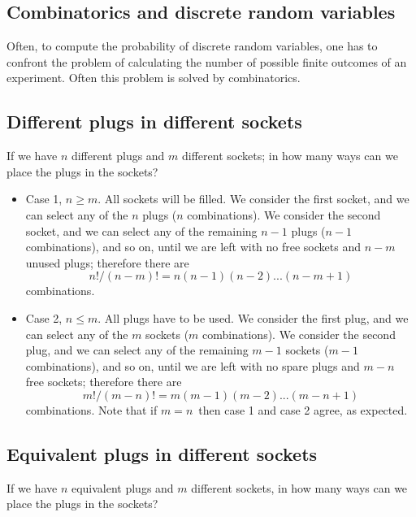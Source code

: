 \documentclass[justified, sixbynine]{tufte-book}
\theoremstyle{plain}%
\newtheorem * {corollary}{Corollary}
\theoremstyle{definition}
\theoremstyle{remark}
\newtheorem * {remark}{Remark}
\newtheorem * {note}{Note}
\begin{document}
\begin{fullwidth}
\goodbreak\section{Combinatorics and discrete random variables}

Often, to compute the probability of discrete random variables, one
has to confront the problem of calculating the number of possible finite
outcomes of an experiment. Often this problem is solved by combinatorics.

\goodbreak\subsection{Different plugs in different sockets}

If we have $n$ different plugs and $m$ different sockets; in how many ways
can we place the plugs in the sockets?

\begin{itemize}
\item  Case 1, $n\geq m$. All sockets will be filled. We consider the first
socket, and we can select any of the $n$ plugs ($n$ combinations). We
consider the second socket, and we can select any of the remaining $n-1$
plugs ($n-1$ combinations), and so on, until we are left with no free sockets
and $n-m$ unused plugs; therefore there are
\begin{equation}
n!/(n-m)!=n(n-1)(n-2)...(n-m+1)
\end{equation}
combinations.

\item  Case 2, $n\leq m$. All plugs have to be used. We consider the first
plug, and we can select any of the $m$ sockets ($m$ combinations). We
consider the second plug, and we can select any of the remaining $m-1$
sockets ($m-1$ combinations), and so on, until we are left with no spare
plugs and $m-n$ free sockets; therefore there are
\begin{equation}
m!/(m-n)!=m(m-1)(m-2)...(m-n+1)
\end{equation}
combinations. Note that if $m=n\, $ then case 1 and case 2 agree, as
expected.
\end{itemize}

\goodbreak\subsection{Equivalent plugs in different sockets}

If we have $n$ equivalent plugs and $m$ different sockets, in how many ways
can we place the plugs in the sockets?


\end{fullwidth}
\end{document}
